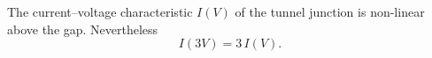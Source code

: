 \documentclass{article}
\begin{document}
The current--voltage characteristic $I(V)$ of the tunnel junction is non-linear above the gap. Nevertheless
\begin{equation}
I(3V) = 3\,I(V) .
\label{eq:lin}
\end{equation}
\end{document}
